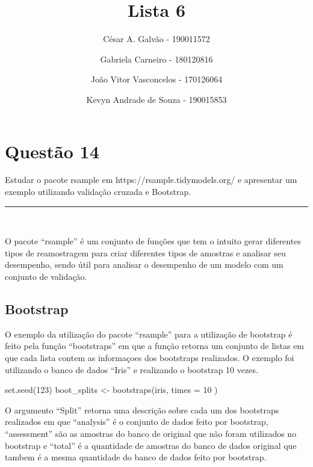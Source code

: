 \documentclass[
  a4paperpaper,
]{article}
\title{Lista 6}
\author{César A. Galvão - 190011572 \and Gabriela Carneiro -
180120816 \and João Vitor Vasconcelos - 170126064 \and Kevyn Andrade de
Souza - 190015853}
\date{}
\newenvironment{Shaded}{\begin{snugshade}}{\end{snugshade}}
\newcommand{\AttributeTok}[1]{\textcolor[rgb]{0.40,0.45,0.13}{#1}}
\newcommand{\DecValTok}[1]{\textcolor[rgb]{0.68,0.00,0.00}{#1}}
\newcommand{\FunctionTok}[1]{\textcolor[rgb]{0.28,0.35,0.67}{#1}}
\newcommand{\NormalTok}[1]{\textcolor[rgb]{0.00,0.23,0.31}{#1}}
\newcommand{\OtherTok}[1]{\textcolor[rgb]{0.00,0.23,0.31}{#1}}
\renewcommand*\contentsname{Índice}
\newcommand\contentsname{Índice}
\begin{document}
\maketitle

\renewcommand*\contentsname{Índice}
{
\hypersetup{linkcolor=}
\setcounter{tocdepth}{2}
\tableofcontents
}
\newpage{}

\section{Questão 14}\label{questuxe3o-14}

Estudar o pacote rsample em https://rsample.tidymodels.org/ e apresentar
um exemplo utilizando validação cruzada e Bootstrap.

\begin{center}\rule{0.5\linewidth}{0.5pt}\end{center}

~

O pacote ``rsample'' é um conjunto de funções que tem o intuito gerar
diferentes tipos de reamostragem para criar diferentes tipos de amostras
e analisar seu desempenho, sendo útil para analisar o desempenho de um
modelo com um conjunto de validação.

\subsection{Bootstrap}\label{bootstrap}

O exemplo da utilização do pacote ``rsample'' para a utilização de
bootstrap é feito pela função ``bootstraps'' em que a função retorna um
conjunto de listas em que cada lista contem as informaçoes dos
bootstraps realizados. O exemplo foi utilizando o banco de dados
``Iris'' e realizando o bootstrap 10 vezes.

\begin{Shaded}
\begin{Highlighting}[]
\FunctionTok{set.seed}\NormalTok{(}\DecValTok{123}\NormalTok{)}
\NormalTok{boot\_splits }\OtherTok{\textless{}{-}} \FunctionTok{bootstraps}\NormalTok{(iris, }\AttributeTok{times =} \DecValTok{10}\NormalTok{ )}
\end{Highlighting}
\end{Shaded}

O argumento ``Split'' retorna uma descrição sobre cada um dos bootstraps
realizados em que ``analysis'' é o conjunto de dados feito por
bootstrap, ``assessment'' são as amostras do banco de original que não
foram utilizados no bootstrap e ``total'' é a quantidade de amostras do
banco de dados original que tambem é a mesma quantidade do banco de
dados feito por bootstrap.
\end{document}
